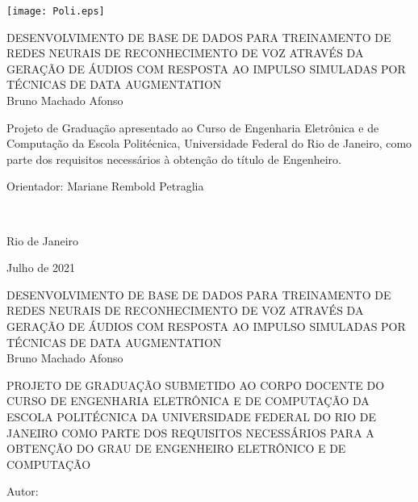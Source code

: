 \texttt{[image: Poli.eps]}

\begin{center}
\large{DESENVOLVIMENTO DE BASE DE DADOS PARA TREINAMENTO DE REDES NEURAIS DE RECONHECIMENTO DE VOZ ATRAVÉS DA GERAÇÃO DE ÁUDIOS COM RESPOSTA
AO IMPULSO SIMULADAS POR TÉCNICAS DE DATA AUGMENTATION}\\
   \vspace{2cm}
\large{Bruno Machado Afonso}\\
\end{center}
   \vspace{3cm}
\hspace{7cm}
\hfill \parbox{8.0cm}{Projeto de Graduação apresentado ao Curso de Engenharia Eletrônica e de Computação da Escola Politécnica,
Universidade Federal do Rio de Janeiro, como parte dos requisitos necessários à obtenção do título de Engenheiro.\\}
   \vspace{1cm}
\hfill \parbox{8.0cm}{Orientador: Mariane Rembold Petraglia} \\
   \vspace{1cm}
\begin{center}
Rio de Janeiro

Julho de 2021
\end{center}

\pagebreak


\begin{center}
\large{DESENVOLVIMENTO DE BASE DE DADOS PARA TREINAMENTO DE REDES NEURAIS DE RECONHECIMENTO DE VOZ ATRAVÉS DA GERAÇÃO DE ÁUDIOS COM RESPOSTA
AO IMPULSO SIMULADAS POR TÉCNICAS DE DATA AUGMENTATION}\\
   \vspace{1cm}
\large{Bruno Machado Afonso}\\
\end{center}
   \vspace{2cm}
PROJETO DE GRADUAÇÃO SUBMETIDO AO CORPO DOCENTE DO CURSO DE ENGENHARIA ELETRÔNICA E DE COMPUTAÇÃO DA ESCOLA POLITÉCNICA DA
UNIVERSIDADE FEDERAL DO RIO DE JANEIRO COMO PARTE DOS REQUISITOS NECESSÁRIOS PARA A OBTENÇÃO DO GRAU DE ENGENHEIRO ELETRÔNICO E DE COMPUTAÇÃO   
   
   \vspace{1cm}
Autor:
      \vspace{0.5cm}
      \begin{flushright}
         \parbox{10cm}{
            \hrulefill

            \vspace{-.375cm}

            \vspace{0.1cm}
         }
      \end{flushright}
      
